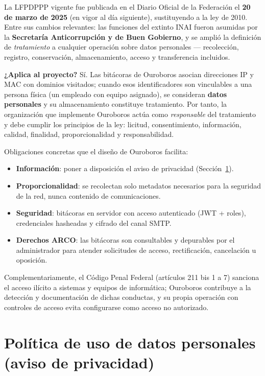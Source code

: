 \documentclass[12pt,letterpaper]{report}
\begin{document}
La LFPDPPP vigente fue publicada en el Diario Oficial de la Federación el
\textbf{20 de marzo de 2025} (en vigor al día siguiente), sustituyendo a la
ley de 2010. Entre sus cambios relevantes: las funciones del extinto INAI
fueron asumidas por la \textbf{Secretaría Anticorrupción y de Buen
Gobierno}, y se amplió la definición de \textit{tratamiento} a cualquier
operación sobre datos personales --- recolección, registro, conservación,
almacenamiento, acceso y transferencia incluidos.

\textbf{¿Aplica al proyecto?} Sí. Las bitácoras de Ouroboros asocian
direcciones IP y MAC con dominios visitados; cuando esos identificadores son
vinculables a una persona física (un empleado con equipo asignado), se
consideran \textbf{datos personales} y su almacenamiento constituye
tratamiento. Por tanto, la organización que implemente Ouroboros actúa como
\textit{responsable} del tratamiento y debe cumplir los principios de la
ley: licitud, consentimiento, información, calidad, finalidad,
proporcionalidad y responsabilidad.

Obligaciones concretas que el diseño de Ouroboros facilita:
\begin{itemize}[nosep]
  \item \textbf{Información}: poner a disposición el aviso de privacidad
        (Sección~\ref{sec:politica}).
  \item \textbf{Proporcionalidad}: se recolectan solo metadatos necesarios
        para la seguridad de la red, nunca contenido de comunicaciones.
  \item \textbf{Seguridad}: bitácoras en servidor con acceso autenticado
        (JWT + roles), credenciales hasheadas y cifrado del canal SMTP.
  \item \textbf{Derechos ARCO}: las bitácoras son consultables y depurables
        por el administrador para atender solicitudes de acceso,
        rectificación, cancelación u oposición.
\end{itemize}

Complementariamente, el Código Penal Federal (artículos 211 bis 1 a 7)
sanciona el acceso ilícito a sistemas y equipos de informática; Ouroboros
contribuye a la detección y documentación de dichas conductas, y su propia
operación con controles de acceso evita configurarse como acceso no
autorizado.

\section{Política de uso de datos personales (aviso de privacidad)}
\label{sec:politica}
\end{document}
